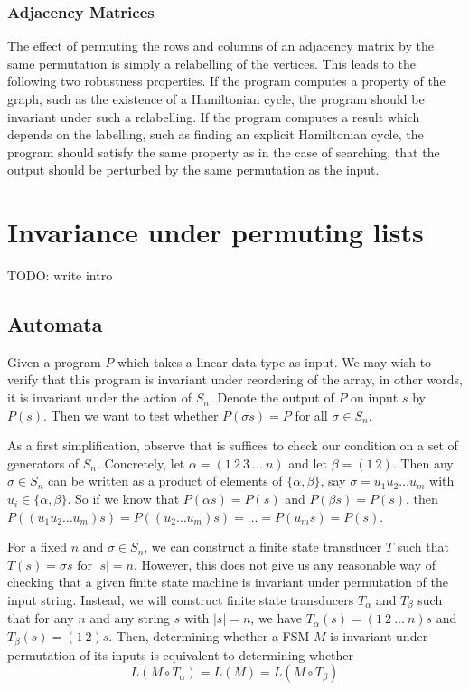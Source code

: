 \documentclass{llncs}
\begin{document}
  \subsubsection{Adjacency Matrices}

    The effect of permuting the rows and columns of an adjacency matrix by the same
    permutation is simply a relabelling of the vertices.  This leads to the following
    two robustness properties.  If the program computes a
    property of the graph, such as the existence of a Hamiltonian cycle, the program
    should be invariant under such a relabelling.  If the program computes a result
    which depends on the labelling, such as finding an explicit Hamiltonian cycle,
    the program should satisfy the same property as in the case of searching, that
    the output should be perturbed by the same permutation as the input.


\section{Invariance under permuting lists}
\label{permlists}

  TODO: write intro

  \subsection{Automata}
    Given a program $P$ which takes a linear data type
    as input. We may wish to verify that this program
    is invariant under reordering of the array,
    in other words, it is invariant under the action of $S_n$.
    Denote the output of $P$ on input $s$ by $P(s)$.
    Then we want to test whether $P(\sigma s) = P$
    for all $\sigma \in S_n$.

    As a first simplification, observe that is
    suffices to check our condition on a set
    of generators of $S_n$.
    Concretely, let $\alpha = (1\ 2\ 3\ ...\ n)$
    and let $\beta = (1\ 2)$.
    Then any $\sigma \in S_n$ can be written as
    a product of elements of $\{\alpha,\beta\}$,
    say $\sigma = u_1 u_2\ldots u_m$ with
    $u_i \in \{\alpha,\beta\}$.
    So if we know that $P(\alpha s) = P(s)$
    and $P(\beta s) = P(s)$, then
    $P((u_1 u_2 \ldots u_m)s)
    = P((u_2 \ldots u_m)s)
    = \ldots = P(u_ms) = P(s) $.

    For a fixed $n$ and $\sigma \in S_n$,
    we can construct a finite state transducer
    $T$ such that $T(s) = \sigma s$ for $|s|=n$.
    However, this does not give us any
    reasonable way of checking that a given
    finite state machine is invariant under permutation
    of the input string.
    Instead, we will construct finite state
    transducers $T_{\alpha}$ and $T_{\beta}$
    such that for any $n$ and any string $s$
    with $|s|=n$, we have
    $T_{\alpha}(s)=(1\ 2\ \ldots\ n) s$ and
    $T_{\beta}(s) = (1\ 2) s$.
    Then, determining whether a FSM $M$ is
    invariant under permutation of its inputs
    is equivalent to determining whether
    \[
      L(M \circ T_\alpha) = L(M) = L(M \circ T_\beta)
    \]
\end{document}
